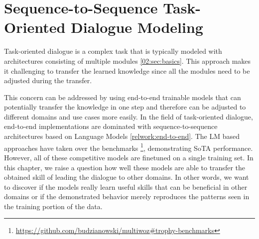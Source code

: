 \chapter{Sequence-to-Sequence Task-Oriented Dialogue Modeling}
\label{chap:lm-tod}
Task-oriented dialogue is a complex task that is typically modeled with architectures consisting of multiple modules \ref{02:sec:basics}.
This approach makes it challenging to transfer the learned knowledge since all the modules need to be adjusted during the transfer.

This concern can be addressed by using end-to-end trainable models that can potentially transfer the knowledge in one step and therefore can be adjusted to different domains and use cases more easily.
In the field of task-oriented dialogue, end-to-end implementations are dominated with sequence-to-sequence architectures based on Language Models \ref{relwork:end-to-end}.
The LM based approaches have taken over the benchmarks \footnote{\url{https://github.com/budzianowski/multiwoz\#trophy-benchmarks}}, demonstrating SoTA performance.
However, all of these competitive models are finetuned on a single training set.
In this chapter, we raise a question how well these models are able to transfer the obtained skill of leading the dialogue to other domains.
In other words, we want to discover if the models really learn useful skills that can be beneficial in other domains or if the demonstrated behavior merely reproduces the patterns seen in the training portion of the data.

